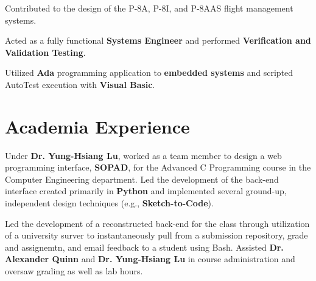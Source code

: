 \documentclass[letterpaper]{deedy-resume} %
\begin{document}
\begin{minipage}[t]{0.66\textwidth}
\begin{tightitemize}
\item Contributed to the design of the P-8A, P-8I, and P-8AAS flight management systems.
\item Acted as a fully functional \textbf{Systems Engineer} and performed \textbf{Verification and Validation Testing}.
\item Utilized \textbf{Ada} programming application to \textbf{embedded systems} and scripted AutoTest execution with \textbf{Visual Basic}.
\end{tightitemize}



\sectionspace %


\section{Academia Experience}


Under \textbf{Dr. Yung-Hsiang Lu}, worked as a team member to design a web programming interface, \textbf{SOPAD}, for the Advanced C Programming course in the Computer Engineering department. Led the development of the back-end interface created primarily in \textbf{Python} and implemented several ground-up, independent design techniques (e.g., \textbf{Sketch-to-Code}).

\sectionspace %



Led the development of a reconstructed back-end for the class through utilization of a university surver to instantaneously pull from a submission repository, grade and assignemtn, and email feedback to a student using Bash. Assisted \textbf{Dr. Alexander Quinn} and \textbf{Dr. Yung-Hsiang Lu} in course administration and oversaw grading as well as lab hours.

\sectionspace %


\end{minipage} %
\end{document}
